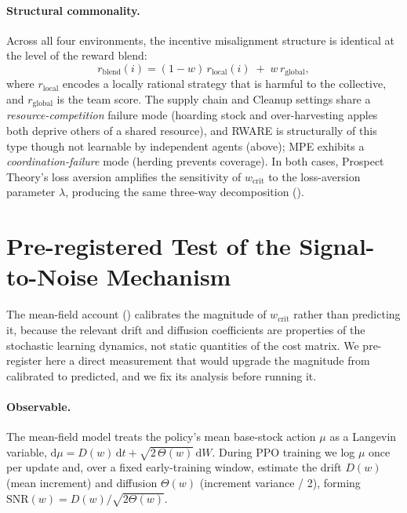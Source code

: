 \documentclass[11pt]{article}
\newcommand{\wcrit}{w_{\mathrm{crit}}}
\begin{document}
\paragraph{Structural commonality.}
Across all four environments, the incentive misalignment structure is identical
at the level of the reward blend:
\begin{equation}
  r_{\text{blend}}(i) = (1-w)\,r_{\text{local}}(i) \;+\; w\,r_{\text{global}},
\end{equation}
where $r_{\text{local}}$ encodes a locally rational strategy that is harmful
to the collective, and $r_{\text{global}}$ is the team score.
The supply chain and Cleanup settings share a \emph{resource-competition}
failure mode (hoarding stock and over-harvesting apples both deprive others of a
shared resource), and RWARE is structurally of this type though not learnable by
independent agents (above); MPE exhibits a \emph{coordination-failure} mode
(herding prevents coverage).
In both cases, Prospect Theory's loss aversion amplifies the sensitivity of
$w_{\text{crit}}$ to the loss-aversion parameter $\lambda$, producing the
same three-way decomposition ().

\section{Pre-registered Test of the Signal-to-Noise Mechanism}
\label{sec:appendix_snr}

The mean-field account () calibrates the magnitude of
$\wcrit$ rather than predicting it, because the relevant drift and diffusion
coefficients are properties of the stochastic learning dynamics, not static
quantities of the cost matrix. We pre-register here a direct measurement that
would upgrade the magnitude from calibrated to predicted, and we fix its
analysis before running it.

\paragraph{Observable.} The mean-field model treats the policy's mean
base-stock action $\mu$ as a Langevin variable,
$\mathrm{d}\mu = D(w)\,\mathrm{d}t + \sqrt{2\,\Theta(w)}\,\mathrm{d}W$. During
PPO training we log $\mu$ once per update and, over a fixed early-training
window, estimate the drift $D(w)$ (mean increment) and diffusion $\Theta(w)$
(increment variance / 2), forming $\mathrm{SNR}(w)=D(w)/\sqrt{2\Theta(w)}$.
\end{document}
